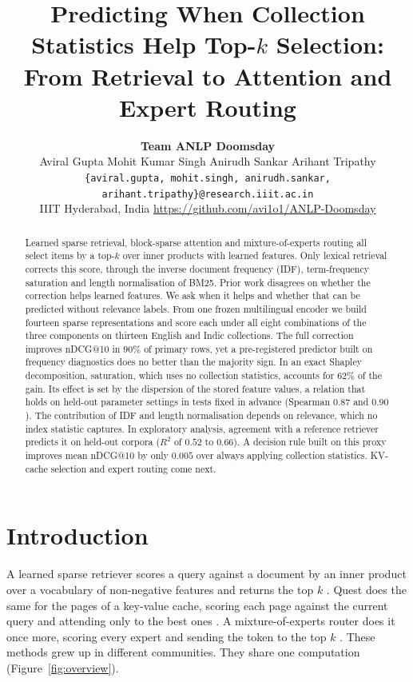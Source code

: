 \documentclass[11pt]{article}
\title{Predicting When Collection Statistics Help Top-$k$ Selection:\\
From Retrieval to Attention and Expert Routing}
\author{
  \textbf{Team ANLP Doomsday} \\[2pt]
  Aviral Gupta \quad Mohit Kumar Singh \quad Anirudh Sankar \quad Arihant Tripathy \\
  \texttt{\{aviral.gupta, mohit.singh, anirudh.sankar,} \\
  \texttt{arihant.tripathy\}@research.iiit.ac.in} \\
  IIIT Hyderabad, India \quad \url{https://github.com/avi1o1/ANLP-Doomsday}
}
\begin{document}
\maketitle

\begin{abstract}
Learned sparse retrieval, block-sparse attention and mixture-of-experts routing all
select items by a top-$k$ over inner products with learned features. Only
lexical retrieval corrects this score, through the inverse document frequency (IDF),
term-frequency saturation and length normalisation of BM25. Prior work disagrees on
whether the correction helps learned features. We ask when it helps and whether that can
be predicted without relevance labels. From one frozen multilingual encoder we build
fourteen sparse representations and score each under all eight combinations of the three
components on thirteen English and Indic collections. The full correction improves nDCG@10 in $90\%$ of primary rows, yet a
pre-registered predictor built on frequency diagnostics does no better than the majority
sign. In an exact Shapley decomposition, saturation, which uses no collection statistics,
accounts for $62\%$ of the gain. Its effect is set by the
dispersion of the stored feature values, a relation that holds on held-out parameter
settings in tests fixed in advance (Spearman $0.87$ and $0.90$). The contribution of IDF
and length normalisation depends on relevance, which no index statistic captures. In
exploratory analysis, agreement with a reference retriever predicts it on held-out
corpora ($R^2$ of $0.52$ to $0.66$). A decision rule built on this proxy improves mean
nDCG@10 by only $0.005$ over always applying collection statistics. KV-cache selection
and expert routing come next.
\end{abstract}

\section{Introduction}
\label{sec:intro}

A learned sparse retriever scores a query against a document by an inner product over a
vocabulary of non-negative features and returns the top $k$
\citep{formal2021splade,nguyen2023unified}. Quest does the same for the pages of a
key-value cache, scoring each page against the current query and attending only to the
best ones \citep{tang2024quest}. A mixture-of-experts router does it once more, scoring
every expert and sending the token to the top $k$ \citep{shazeer2017moe,fedus2022switch}.
These methods grew up in different communities. They share one computation
(Figure~\ref{fig:overview}).
\end{document}
